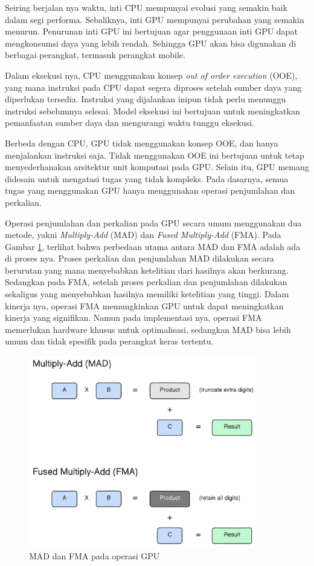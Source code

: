 Seiring berjalan nya waktu, inti CPU mempunyai evolusi yang semakin baik dalam
segi performa. Sebaliknya, inti GPU mempunyai perubahan yang semakin menurun.
Penurunan inti GPU ini bertujuan agar penggunaan inti GPU dapat mengkonsumsi
daya yang lebih rendah. Sehingga GPU akan bisa digunakan di berbagai perangkat,
termasuk perangkat mobile.

Dalam eksekusi nya, CPU menggunakan konsep \emph{out of order execution} (OOE),
yang mana instruksi pada CPU dapat segera diproses setelah sumber daya yang
diperlukan tersedia. Instruksi yang dijalankan inipun tidak perlu menunggu
instruksi sebelumnya selesai. Model eksekusi ini bertujuan untuk meningkatkan
pemanfaatan sumber daya dan mengurangi waktu tunggu eksekusi.

Berbeda dengan CPU, GPU tidak menggunakan konsep OOE, dan hanya menjalankan
instruksi saja. Tidak menggunakan OOE ini bertujuan untuk tetap menyederhanakan
arsitektur unit komputasi pada GPU. Selain itu, GPU memang didesain untuk
mengatasi tugas yang tidak kompleks. Pada dasarnya, semua tugas yang
menggunakan GPU hanya menggunakan operasi penjumlahan dan perkalian.

Operasi penjumlahan dan perkalian pada GPU secara umum menggunakan dua metode,
yakni \emph{Multiply-Add} (MAD) dan \emph{Fused Multiply-Add} (FMA). Pada
Gambar \ref{gambar mad-and-fma}, terlihat bahwa perbedaan utama antara MAD dan
FMA adalah ada di proses nya. Proses perkalian dan penjumlahan MAD dilakukan
secara berurutan yang mana menyebabkan ketelitian dari hasilnya akan berkurang.
Sedangkan pada FMA, setelah proses perkalian dan penjumlahan dilakukan
sekaligus yang menyebabkan hasilnya memiliki ketelitian yang tinggi. Dalam
kinerja nya, operasi FMA memungkinkan GPU untuk dapat meningkatkan kinerja yang
signifikan. Namun pada implementasi nya, operasi FMA memerlukan hardware khusus
untuk optimalisasi, sedangkan MAD bisa lebih umum dan tidak spesifik pada
perangkat keras tertentu.

\begin{figure}[H]
	\centering
	\includegraphics[width=10cm]{images/mad-and-fma-2.png}
	\caption{MAD dan FMA pada operasi GPU}
	\label{gambar mad-and-fma}
\end{figure}

